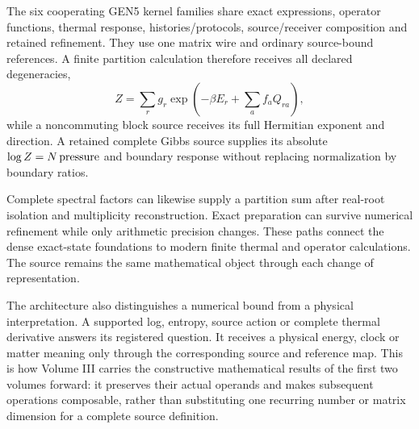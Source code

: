The six cooperating GEN5 kernel families share exact expressions, operator functions, thermal response, histories/protocols, source/receiver composition and retained refinement. They use one matrix wire and ordinary source-bound references. A finite partition calculation therefore receives all declared degeneracies,
\[
 Z=\sum_rg_r
 \exp\!\left(-\beta E_r+\sum_af_aQ_{ra}\right),
\]
while a noncommuting block source receives its full Hermitian exponent and direction. A retained complete Gibbs source supplies its absolute $\log Z=N\,{\rm pressure}$ and boundary response without replacing normalization by boundary ratios.

Complete spectral factors can likewise supply a partition sum after real-root isolation and multiplicity reconstruction. Exact preparation can survive numerical refinement while only arithmetic precision changes. These paths connect the dense exact-state foundations to modern finite thermal and operator calculations. The source remains the same mathematical object through each change of representation.

The architecture also distinguishes a numerical bound from a physical interpretation. A supported log, entropy, source action or complete thermal derivative answers its registered question. It receives a physical energy, clock or matter meaning only through the corresponding source and reference map. This is how Volume III carries the constructive mathematical results of the first two volumes forward: it preserves their actual operands and makes subsequent operations composable, rather than substituting one recurring number or matrix dimension for a complete source definition.
